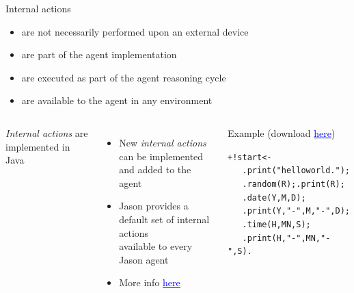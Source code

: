 \documentclass[compress]{beamer}
\newcommand{\link}[2]{\href{#1}{\underline{\textcolor{blue}{#2}}}}
\newcommand{\planhead}[1]{\textcolor{indiagreen}{#1}}
\begin{document}
 

\begin{frame}{Internal actions}

\footnotesize

 
\begin{itemize}
 \item are not necessarily performed upon an external device
 \item are part of the agent implementation
 \item are executed as part of the agent reasoning cycle
 \item are available to the agent in any environment
\end{itemize}


\begin{columns}
 \textit{Internal actions} are implemented in Java
\begin{itemize}\scriptsize
 \item {\scriptsize New \textit{internal actions} can be implemented}\\ {\tiny and added to the agent}
 \item Jason provides a default set of internal actions\\
 {\tiny available to every Jason agent} 
 \item More info \link{http://jason.sourceforge.net/api/jason/stdlib/package-summary.html}{here}
\end{itemize}

\begin{block}{{\scriptsize Example} {\tiny (download \link{http://maiquelb.github.io/sepex2020/codes/example_internal_actions.zip}{here})}}%
\begin{alltt}\tiny
\planhead{+!start} <- \\
   \ \ \ .print("hello world.");\\
   \ \ \ .random(R); .print(R);\\
   \ \ \ .date(Y,M,D); \\ \ \ \ .print(Y,"-",M,"-",D);\\
   \ \ \ .time(H,MN,S); \\ \ \ \ .print(H,"-",MN,"-",S).\\
   \ \\ \ \\ \ \\ \ \\ \ \\ \ \\
\end{alltt}
\end{block}

\end{columns}





\end{frame}
\end{document}
